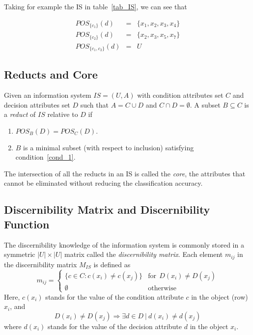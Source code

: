 \documentclass[authoryear,11pt]{elsarticle}
\begin{document}
  Taking for example the IS in table~\ref{tab_IS}, we can see that
  
  $$\begin{array}{lcc}
  POS_{\lbrace c_1 \rbrace}(d)     &=& \lbrace x_1,x_2,x_3,x_4 \rbrace\\
  POS_{\lbrace c_2 \rbrace}(d)     &=& \lbrace x_2,x_3,x_5,x_7 \rbrace\\
  POS_{\lbrace c_1, c_2 \rbrace}(d)&=& U
  \end{array}$$
 
\subsection{Reducts and Core}\label{def_reduct}
  Given an information system $IS=(U,A)$ with condition attributes set $C$ and decision attributes set
  $D$ such that $A=C \cup D$ and $C \cap D =\emptyset$. A subset $B \subseteq C$ is a \textit{reduct} 
  of $IS$ relative to $D$ if
  \begin{enumerate}
  	\item $POS_B(D)=POS_C(D)$. \label{cond_1}
  	\item $B$ is a minimal subset (with respect to inclusion) satisfying condition~\ref{cond_1}.\label{cond_2}
  \end{enumerate}
  
  The intersection of all the reducts in an IS is called the \textit{core}, the attributes that cannot be
  eliminated without reducing the classification accuracy.
  
\subsection{Discernibility Matrix and Discernibility Function}
  The discernibility knowledge of the information system is commonly stored in a symmetric $|U| \times |U|$
  matrix called the \textit{discernibility matrix}. Each element $m_{ij}$ in the discernibility matrix 
  $M_{IS}$ is defined as   
  \begin{equation}
  	m_{ij}=\left\lbrace\begin{array}{cl}
  			\lbrace c \in C: c(x_i) \neq c(x_j) \rbrace & \mathrm{for~~}D(x_i) \neq D(x_j)\\
  			\emptyset 								   & \mathrm{otherwise} 
  	\end{array}\right.
  \end{equation}  
  Here, $c(x_i)$ stands for the value of the condition attribute $c$ in the object (row) $x_i$, and 
  $$D(x_i) \neq D(x_j) \Rightarrow \exists d \in D~ |~ d(x_i) \neq d(x_j)$$ 
  where $d(x_i)$ stands for the value  of the decision attribute $d$ in the object $x_i$.
  
\end{document}
